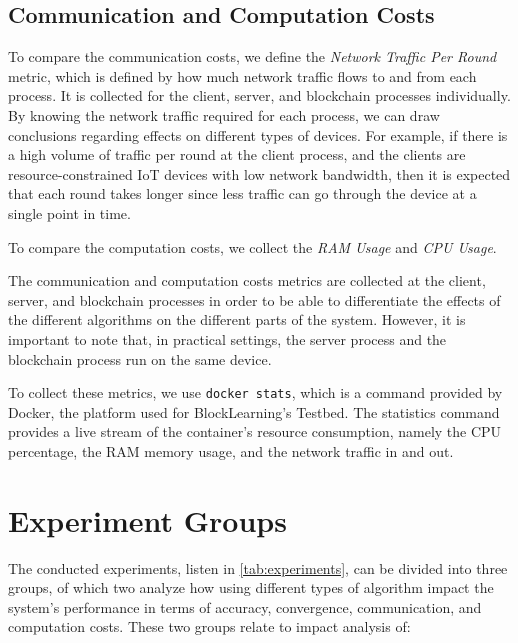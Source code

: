 \subsection{Communication and Computation Costs}

To compare the communication costs, we define the \textit{Network Traffic Per Round} metric, which is defined by how much network traffic flows to and from each process. It is collected for the client, server, and blockchain processes individually. By knowing the network traffic required for each process, we can draw conclusions regarding effects on different types of devices. For example, if there is a high volume of traffic per round at the client process, and the clients are resource-constrained IoT devices with low network bandwidth, then it is expected that each round takes longer since less traffic can go through the device at a single point in time.

To compare the computation costs, we collect the \textit{RAM Usage} and \textit{CPU Usage}. 

The communication and computation costs metrics are collected at the client, server, and blockchain processes in order to be able to differentiate the effects of the different algorithms on the different parts of the system. However, it is important to note that, in practical settings, the server process and the blockchain process run on the same device.

To collect these metrics, we use \texttt{docker stats}, which is a command provided by Docker, the platform used for BlockLearning's Testbed. The statistics command provides a live stream of the container's resource consumption, namely the CPU percentage, the RAM memory usage, and the network traffic in and out.

\section{Experiment Groups}\label{meth:experiments}

The conducted experiments, listen in \autoref{tab:experiments}, can be divided into three groups, of which two analyze how using different types of algorithm impact the system's performance in terms of accuracy, convergence, communication, and computation costs. These two groups relate to impact analysis of:

